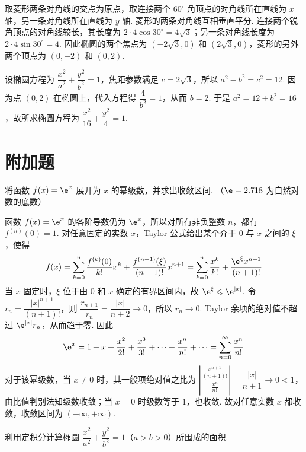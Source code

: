 \begin{solution}
取菱形两条对角线的交点为原点，取连接两个 \(60^\circ\) 角顶点的对角线所在直线为 \(x\) 轴，另一条对角线所在直线为 \(y\) 轴. 菱形的两条对角线互相垂直平分. 连接两个锐角顶点的对角线较长，其长度为 \(2\cdot4\cos30^\circ=4\sqrt{3}\)；另一条对角线长度为 \(2\cdot4\sin30^\circ=4\). 因此椭圆的两个焦点为 \(\left(-2\sqrt{3},0\right)\) 和 \(\left(2\sqrt{3},0\right)\)，菱形的另外两个顶点为 \((0,-2)\) 和 \((0,2)\).

设椭圆方程为 \(\dfrac{x^2}{a^2}+\dfrac{y^2}{b^2}=1\)，焦距参数满足 \(c=2\sqrt{3}\)，所以 \(a^2-b^2=c^2=12\). 因为点 \((0,2)\) 在椭圆上，代入方程得 \(\dfrac{4}{b^2}=1\)，从而 \(b=2\). 于是 \(a^2=12+b^2=16\)，故所求椭圆方程为 \(\dfrac{x^2}{16}+\dfrac{y^2}{4}=1\).
\end{solution}

\section{附加题}

\begin{problem}
将函数 \(f(x)=\e^x\) 展开为 \(x\) 的幂级数，并求出收敛区间. （\(\e=2.718\) 为自然对数的底数）
\end{problem}

\begin{solution}
函数 \(f(x)=\e^x\) 的各阶导数仍为 \(\e^x\)，所以对所有非负整数 \(n\)，都有 \(f^{(n)}(0)=1\). 对任意固定的实数 \(x\)，Taylor 公式给出某个介于 \(0\) 与 \(x\) 之间的 \(\xi\)，使得
\[
f(x)=\sum_{k=0}^{n}\frac{f^{(k)}(0)}{k!}x^k+\frac{f^{(n+1)}(\xi)}{(n+1)!}x^{n+1}=\sum_{k=0}^{n}\frac{x^k}{k!}+\frac{\e^{\xi}x^{n+1}}{(n+1)!}
\]
当 \(x\) 固定时，\(\xi\) 位于由 \(0\) 和 \(x\) 确定的有界区间内，故 \(\e^{\xi}\leqslant\e^{|x|}\). 令 \(r_n=\dfrac{|x|^{n+1}}{(n+1)!}\)，则 \(\dfrac{r_{n+1}}{r_n}=\dfrac{|x|}{n+2}\to0\)，所以 \(r_n\to0\). Taylor 余项的绝对值不超过 \(\e^{|x|}r_n\)，从而趋于零. 因此
\[
\e^x=1+x+\frac{x^2}{2!}+\frac{x^3}{3!}+\cdots+\frac{x^n}{n!}+\cdots=\sum_{n=0}^{\infty}\frac{x^n}{n!}
\]
对于该幂级数，当 \(x\ne0\) 时，其一般项绝对值之比为 \(\left|\dfrac{\frac{x^{n+1}}{(n+1)!}}{\frac{x^n}{n!}}\right|=\dfrac{|x|}{n+1}\to0<1\)，由比值判别法知级数收敛；当 \(x=0\) 时级数等于 \(1\)，也收敛. 故对任意实数 \(x\) 都收敛，收敛区间为 \(\left(-\infty,+\infty\right)\).
\end{solution}

\begin{problem}
利用定积分计算椭圆 \(\dfrac{x^2}{a^2}+\dfrac{y^2}{b^2}=1\)（\(a>b>0\)）所围成的面积.
\end{problem}

